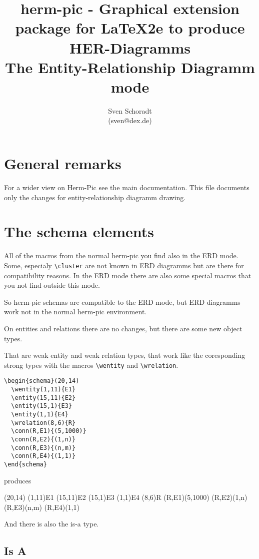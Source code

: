 \documentclass[a4paper,11pt]{article}
\author{Sven Schoradt \\ (sven@dex.de)}
\title{herm-pic - Graphical extension package for LaTeX2e to produce 
       HER-Diagramms\\The Entity-Relationship Diagramm mode}
\begin{document}
\maketitle

\section{General remarks}

For a wider view on Herm-Pic see the main documentation. This file documents only the 
changes for entity-relationship diagramm drawing.

\section{The schema elements}

All of the macros from the normal herm-pic you find also in the ERD mode.
Some, especialy \verb|\cluster| are not known in ERD diagramms but are there for 
compatibility reasons. 
In the ERD mode there are also some special macros that you not find outside this mode.

So herm-pic schemas are compatible to the ERD mode, but ERD diagramms work not 
in the normal herm-pic environment.

On entities and relations there are no changes, but there are some new 
object types.

That are weak entity and weak relation types, that work like the coresponding 
strong types with the macros \verb|\wentity| and \verb|\wrelation|.

\begin{verbatim}
\begin{schema}(20,14)
  \wentity(1,11){E1}
  \entity(15,11){E2}
  \entity(15,1){E3}
  \entity(1,1){E4}
  \wrelation(8,6){R}
  \conn(R,E1){(5,1000)}
  \conn(R,E2){(1,n)}
  \conn(R,E3){(n,m)}
  \conn(R,E4){(1,1)}
\end{schema}
\end{verbatim}

produces

\begin{schema}(20,14)
  \wentity(1,11){E1}
  \entity(15,11){E2}
  \entity(15,1){E3}
  \entity(1,1){E4}
  \wrelation(8,6){R}
  \conn(R,E1){(5,1000)}
  \conn(R,E2){(1,n)}
  \conn(R,E3){(n,m)}
  \conn(R,E4){(1,1)}
\end{schema}

And there is also the is-a type. 

\subsection{Is A}
\end{document}
